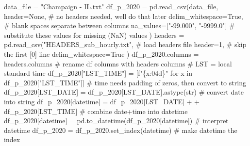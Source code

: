 \documentclass[
  letterpaper,
  DIV=11,
  numbers=noendperiod]{scrreprt}
\newenvironment{Shaded}{\begin{snugshade}}{\end{snugshade}}
\newcommand{\BuiltInTok}[1]{\textcolor[rgb]{0.00,0.23,0.31}{#1}}
\newcommand{\CommentTok}[1]{\textcolor[rgb]{0.37,0.37,0.37}{#1}}
\newcommand{\ControlFlowTok}[1]{\textcolor[rgb]{0.00,0.23,0.31}{#1}}
\newcommand{\DecValTok}[1]{\textcolor[rgb]{0.68,0.00,0.00}{#1}}
\newcommand{\KeywordTok}[1]{\textcolor[rgb]{0.00,0.23,0.31}{#1}}
\newcommand{\NormalTok}[1]{\textcolor[rgb]{0.00,0.23,0.31}{#1}}
\newcommand{\OperatorTok}[1]{\textcolor[rgb]{0.37,0.37,0.37}{#1}}
\newcommand{\SpecialCharTok}[1]{\textcolor[rgb]{0.37,0.37,0.37}{#1}}
\newcommand{\SpecialStringTok}[1]{\textcolor[rgb]{0.13,0.47,0.30}{#1}}
\newcommand{\StringTok}[1]{\textcolor[rgb]{0.13,0.47,0.30}{#1}}
\newcommand{\VariableTok}[1]{\textcolor[rgb]{0.07,0.07,0.07}{#1}}
\begin{document}
\begin{Shaded}
\begin{Highlighting}[]
\NormalTok{data\_file }\OperatorTok{=} \StringTok{"Champaign {-} IL.txt"}
\NormalTok{df\_p\_2020 }\OperatorTok{=}\NormalTok{ pd.read\_csv(data\_file,}
\NormalTok{                        header}\OperatorTok{=}\VariableTok{None}\NormalTok{,                      }\CommentTok{\# no headers needed, we\textquotesingle{}ll do that later}
\NormalTok{                        delim\_whitespace}\OperatorTok{=}\VariableTok{True}\NormalTok{,            }\CommentTok{\# blank spaces separate between columns}
\NormalTok{                        na\_values}\OperatorTok{=}\NormalTok{[}\StringTok{"{-}99.000"}\NormalTok{, }\StringTok{"{-}9999.0"}\NormalTok{]  }\CommentTok{\# substitute these values for missing (NaN) values}
\NormalTok{                       )}
\NormalTok{headers }\OperatorTok{=}\NormalTok{ pd.read\_csv(}\StringTok{"HEADERS\_sub\_hourly.txt"}\NormalTok{,    }\CommentTok{\# load headers file}
\NormalTok{                      header}\OperatorTok{=}\DecValTok{1}\NormalTok{,                    }\CommentTok{\# skip the first [0] line}
\NormalTok{                      delim\_whitespace}\OperatorTok{=}\VariableTok{True}
\NormalTok{                     )}
\NormalTok{df\_p\_2020.columns }\OperatorTok{=}\NormalTok{ headers.columns                       }\CommentTok{\# rename df columns with headers columns}
\CommentTok{\# LST = local standard time}
\NormalTok{df\_p\_2020[}\StringTok{"LST\_TIME"}\NormalTok{] }\OperatorTok{=}\NormalTok{ [}\SpecialStringTok{f"}\SpecialCharTok{\{}\NormalTok{x}\SpecialCharTok{:04d\}}\SpecialStringTok{"} \ControlFlowTok{for}\NormalTok{ x }\KeywordTok{in}\NormalTok{ df\_p\_2020[}\StringTok{"LST\_TIME"}\NormalTok{]]  }\CommentTok{\# time needs padding of zeros, then convert to string}
\NormalTok{df\_p\_2020[}\StringTok{\textquotesingle{}LST\_DATE\textquotesingle{}}\NormalTok{] }\OperatorTok{=}\NormalTok{ df\_p\_2020[}\StringTok{\textquotesingle{}LST\_DATE\textquotesingle{}}\NormalTok{].astype(}\BuiltInTok{str}\NormalTok{)            }\CommentTok{\# convert date into string}
\NormalTok{df\_p\_2020[}\StringTok{\textquotesingle{}datetime\textquotesingle{}}\NormalTok{] }\OperatorTok{=}\NormalTok{ df\_p\_2020[}\StringTok{\textquotesingle{}LST\_DATE\textquotesingle{}}\NormalTok{] }\OperatorTok{+} \StringTok{\textquotesingle{} \textquotesingle{}} \OperatorTok{+}\NormalTok{ df\_p\_2020[}\StringTok{\textquotesingle{}LST\_TIME\textquotesingle{}}\NormalTok{] }\CommentTok{\# combine date+time into datetime}
\NormalTok{df\_p\_2020[}\StringTok{\textquotesingle{}datetime\textquotesingle{}}\NormalTok{] }\OperatorTok{=}\NormalTok{ pd.to\_datetime(df\_p\_2020[}\StringTok{\textquotesingle{}datetime\textquotesingle{}}\NormalTok{])        }\CommentTok{\# interpret datetime}
\NormalTok{df\_p\_2020 }\OperatorTok{=}\NormalTok{ df\_p\_2020.set\_index(}\StringTok{\textquotesingle{}datetime\textquotesingle{}}\NormalTok{)                          }\CommentTok{\# make datetime the index}
\end{Highlighting}
\end{Shaded}
\end{document}
